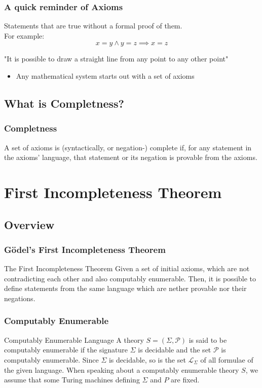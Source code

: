 \documentclass[aspectratio=169]{beamer}
\begin{document}
\begin{frame}
	\frametitle{A quick reminder of Axioms}
	 \begin{Definition}[Axiom]
	 	Statements that are true without a formal proof of them. \\ For example:
	 	\[x = y \land y = z \implies x = z\]
	  	\begin{center}
	  		"It is possible to draw a straight line from any point to any other point"
	  	\end{center}
	 \end{Definition}
	 \begin{itemize}
	 	\item Any mathematical system starts out with a set of axioms
	 \end{itemize}
\end{frame}
\subsection{What is Completness?}
\begin{frame}
	\frametitle{Completness}
	 \begin{Definition}[Complete]
	 	A set of axioms is (syntactically, or negation-) complete if, for any statement in the axioms' language, that statement or its negation is provable from the axioms. \cite{smith}
	 \end{Definition}
\end{frame}
\section{First Incompleteness Theorem}
\subsection{Overview}
\begin{frame}
	\frametitle{Gödel's First Incompleteness Theorem}
	\begin{block}{The First Incompleteness Theorem}
		Given a set of initial axioms, which are not contradicting each other and also computably enumerable. Then, it is possible to define statements from the same language which are nether provable nor their negations.
	\end{block}
\end{frame}

\begin{frame}
	\frametitle{Computably Enumerable}
	\begin{block}{Computably Enumerable Language}
	A theory $S=(\Sigma, \mathscr{P})$ is said to be computably enumerable if the signature $\Sigma$ is decidable and the set $\mathscr{P}$ is computably enumerable. Since $\Sigma$ is decidable, so is the set $\mathscr{L}_{\Sigma}$ of all formulae of the given language. When speaking about a computably enumerable theory $S$, we assume that some Turing machines defining $\Sigma$ and $P$ are fixed.
	\end{block}
\begin{flushright}
	\cite{bekl}
\end{flushright}
\end{frame}
\end{document}
